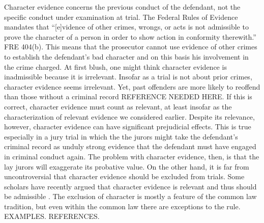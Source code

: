 \documentclass[10pt]{article}
\begin{document}
Character evidence concerns the previous conduct of the defendant, not the specific conduct 
under examination at trial.  The Federal Rules of Evidence mandates that  ``[e]vidence of other crimes, wrongs, or acts is not admissible to prove 
the character of a person in order to show action in conformity therewith.'' FRE 404(b). This means that the prosecutor cannot use evidence of other crimes to establish the defendant's bad character and on this basis his involvement in the crime charged.
At first blush, one might think character evidence is inadmissible because it is irrelevant. Insofar as a trial is not about prior crimes, 
character evidence seems irrelevant. Yet, past offenders are more likely to reoffend than those without a criminal record REFERENCE NEEDED HERE. If this is correct, 
character evidence must count as relevant, at least insofar as the characterization of relevant evidence we considered earlier. 
Despite its relevance, however, character evidence can have significant prejudicial effects. 
This is true especially in a jury trial in which the the jurors might take 
the defendant's criminal record as unduly strong evidence that the defendant must have engaged in criminal conduct again. The problem with character evidence, then, is that the lay jurors will exaggerate its probative value. 
On the other hand, it is far from uncontroversial that character evidence should be excluded from trials. 
Some scholars have recently argued that character evidence is relevant and thus should be admissible \citep{redmayne02}.
The exclusion of character is mostly a feature of the common law tradition, but even within the common law there are  
exceptions to the rule. EXAMPLES. REFERENCES. %
\end{document}
